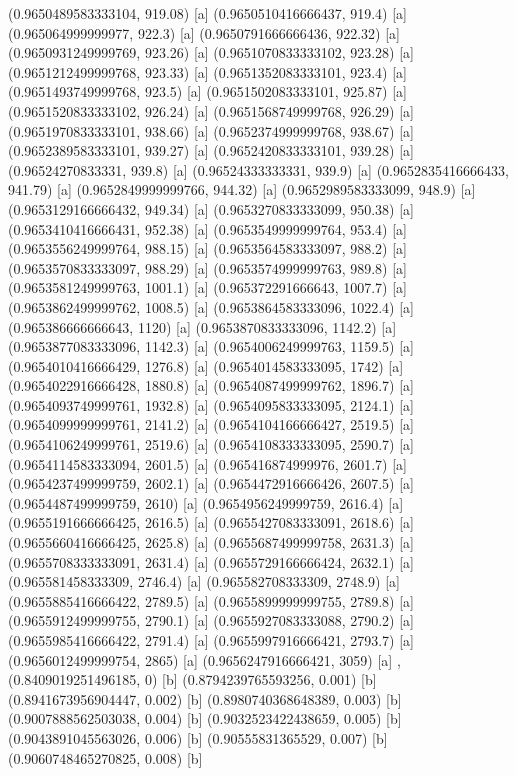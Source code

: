 {{{(0.9650489583333104, 919.08) [a] 
(0.9650510416666437, 919.4) [a] 
(0.965064999999977, 922.3) [a] 
(0.9650791666666436, 922.32) [a] 
(0.9650931249999769, 923.26) [a] 
(0.9651070833333102, 923.28) [a] 
(0.9651212499999768, 923.33) [a] 
(0.9651352083333101, 923.4) [a] 
(0.9651493749999768, 923.5) [a] 
(0.9651502083333101, 925.87) [a] 
(0.9651520833333102, 926.24) [a] 
(0.9651568749999768, 926.29) [a] 
(0.9651970833333101, 938.66) [a] 
(0.9652374999999768, 938.67) [a] 
(0.9652389583333101, 939.27) [a] 
(0.9652420833333101, 939.28) [a] 
(0.96524270833331, 939.8) [a] 
(0.96524333333331, 939.9) [a] 
(0.9652835416666433, 941.79) [a] 
(0.9652849999999766, 944.32) [a] 
(0.9652989583333099, 948.9) [a] 
(0.9653129166666432, 949.34) [a] 
(0.9653270833333099, 950.38) [a] 
(0.9653410416666431, 952.38) [a] 
(0.9653549999999764, 953.4) [a] 
(0.9653556249999764, 988.15) [a] 
(0.9653564583333097, 988.2) [a] 
(0.9653570833333097, 988.29) [a] 
(0.9653574999999763, 989.8) [a] 
(0.9653581249999763, 1001.1) [a] 
(0.965372291666643, 1007.7) [a] 
(0.9653862499999762, 1008.5) [a] 
(0.9653864583333096, 1022.4) [a] 
(0.965386666666643, 1120) [a] 
(0.9653870833333096, 1142.2) [a] 
(0.9653877083333096, 1142.3) [a] 
(0.9654006249999763, 1159.5) [a] 
(0.9654010416666429, 1276.8) [a] 
(0.9654014583333095, 1742) [a] 
(0.9654022916666428, 1880.8) [a] 
(0.9654087499999762, 1896.7) [a] 
(0.9654093749999761, 1932.8) [a] 
(0.9654095833333095, 2124.1) [a] 
(0.9654099999999761, 2141.2) [a] 
(0.9654104166666427, 2519.5) [a] 
(0.9654106249999761, 2519.6) [a] 
(0.9654108333333095, 2590.7) [a] 
(0.9654114583333094, 2601.5) [a] 
(0.965416874999976, 2601.7) [a] 
(0.9654237499999759, 2602.1) [a] 
(0.9654472916666426, 2607.5) [a] 
(0.9654487499999759, 2610) [a] 
(0.9654956249999759, 2616.4) [a] 
(0.9655191666666425, 2616.5) [a] 
(0.9655427083333091, 2618.6) [a] 
(0.9655660416666425, 2625.8) [a] 
(0.9655687499999758, 2631.3) [a] 
(0.9655708333333091, 2631.4) [a] 
(0.9655729166666424, 2632.1) [a] 
(0.965581458333309, 2746.4) [a] 
(0.965582708333309, 2748.9) [a] 
(0.9655885416666422, 2789.5) [a] 
(0.9655899999999755, 2789.8) [a] 
(0.9655912499999755, 2790.1) [a] 
(0.9655927083333088, 2790.2) [a] 
(0.9655985416666422, 2791.4) [a] 
(0.9655997916666421, 2793.7) [a] 
(0.9656012499999754, 2865) [a] 
(0.9656247916666421, 3059) [a] 
},{(0.8409019251496185, 0) [b] 
(0.8794239765593256, 0.001) [b] 
(0.8941673956904447, 0.002) [b] 
(0.8980740368648389, 0.003) [b] 
(0.9007888562503038, 0.004) [b] 
(0.9032523422438659, 0.005) [b] 
(0.9043891045563026, 0.006) [b] 
(0.90555831365529, 0.007) [b] 
(0.9060748465270825, 0.008) [b] 
}}}
